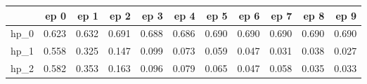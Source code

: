 \begin{tabular}{lrrrrrrrrrr}
\toprule
{} &   ep 0 &   ep 1 &   ep 2 &   ep 3 &   ep 4 &   ep 5 &   ep 6 &   ep 7 &   ep 8 &   ep 9 \\
\midrule
hp\_0 &  0.623 &  0.632 &  0.691 &  0.688 &  0.686 &  0.690 &  0.690 &  0.690 &  0.690 &  0.690 \\
hp\_1 &  0.558 &  0.325 &  0.147 &  0.099 &  0.073 &  0.059 &  0.047 &  0.031 &  0.038 &  0.027 \\
hp\_2 &  0.582 &  0.353 &  0.163 &  0.096 &  0.079 &  0.065 &  0.047 &  0.058 &  0.035 &  0.033 \\
\bottomrule
\end{tabular}
